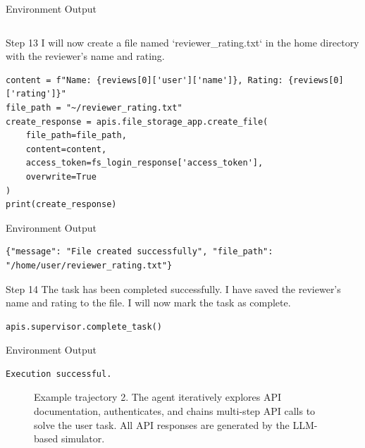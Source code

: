 \begin{center}
\begin{envbox}{Environment Output}
\begin{Verbatim}[fontsize=\scriptsize, breaklines, breakanywhere]
\end{Verbatim}
\end{envbox}

\begin{agentbox}{Step 13}
I will now create a file named `reviewer\_rating.txt` in the home directory with the reviewer's name and rating.
\begin{Verbatim}[fontsize=\scriptsize, breaklines, breakanywhere]
content = f"Name: {reviews[0]['user']['name']}, Rating: {reviews[0]['rating']}"
file_path = "~/reviewer_rating.txt"
create_response = apis.file_storage_app.create_file(
    file_path=file_path,
    content=content,
    access_token=fs_login_response['access_token'],
    overwrite=True
)
print(create_response)
\end{Verbatim}
\end{agentbox}
\begin{envbox}{Environment Output}
\begin{Verbatim}[fontsize=\scriptsize, breaklines, breakanywhere]
{"message": "File created successfully", "file_path": "/home/user/reviewer_rating.txt"}

\end{Verbatim}
\end{envbox}

\begin{agentbox}{Step 14}
The task has been completed successfully. I have saved the reviewer's name and rating to the file. I will now mark the task as complete.
\begin{Verbatim}[fontsize=\scriptsize, breaklines, breakanywhere]
apis.supervisor.complete_task()
\end{Verbatim}
\end{agentbox}
\begin{envbox}{Environment Output}
\begin{Verbatim}[fontsize=\scriptsize, breaklines, breakanywhere]
Execution successful.
\end{Verbatim}
\end{envbox}

\end{center}
\begin{figure}[ht]
\caption{Example trajectory 2. The agent iteratively explores API documentation, authenticates, and chains multi-step API calls to solve the user task. All API responses are generated by the LLM-based simulator.}
\label{fig:traj-example2}
\end{figure}



